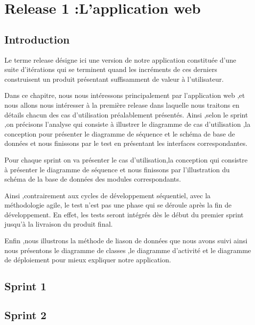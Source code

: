 \chapter{Release 1 :L'application web}
\section{Introduction}


Le terme release d\'{e}signe ici une version de notre application constitu\'{e}e d'une suite d'it\'{e}rations
qui se terminent quand les incr\'{e}ments de ces derniers construisent un produit pr\'{e}sentant
suffisamment de valeur \`{a} l'utilisateur.

Dans ce chapitre, nous nous intéressons principalement par l'application web ,et nous allons nous int\'{e}resser \`{a} la premi\`{e}re release dans laquelle nous traitons en d\'{e}tails chacun des cas d'utilisation pr\'{e}alablement pr\'{e}sent\'{e}s.
Ainsi ,selon le sprint ,on précisons l'analyse qui consiste  \`{a} illustrer le diagramme de cas d'utilisation ,la conception pour pr\'{e}senter
le diagramme de s\'{e}quence et le sch\'{e}ma  de base de donn\'{e}es et nous finissons par le test en pr\'{e}sentant
les interfaces correspondantes.

Pour chaque sprint on va pr\'{e}senter le cas d'utilisation,la conception
qui consistre à pr\'{e}senter le diagramme de  s\'{e}quence
et nous finissons par l'illustration du sch\'{e}ma de la base de donn\'{e}es  des modules correspondants.

Ainsi ,contrairement aux cycles de d\'{e}veloppement s\'{e}quentiel, avec la m\'{e}thodologie agile, le test n'est
pas une phase qui se d\'{e}roule apr\`{e}s la fin de d\'{e}veloppement. En effet, les tests seront int\'{e}gr\'{e}s
d\`{e}s le d\'{e}but du premier sprint jusqu'\`{a} la livraison du produit final.

Enfin ,nous illustrons  la m\'{e}thode de liason de donn\'{e}es que nous avons suivi
ainsi nous présentons le diagramme de classes ,le diagramme  d'activit\'{e} et le diagramme  de d\'{e}ploiement
pour mieux expliquer notre application.


\section{ Sprint 1 }


\section{ Sprint 2 }


